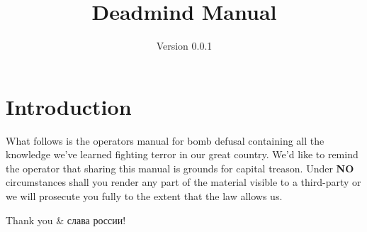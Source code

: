 \documentclass{article}
\title{Deadmind Manual}
\date{Version 0.0.1}
\begin{document}
\maketitle

\section* {Introduction}
What follows is the operators manual for bomb defusal containing all the knowledge we've learned fighting terror in our great country. We'd like to remind the operator that sharing this manual is grounds for capital treason. Under \textbf{NO} circumstances shall you render any part of the material visible to a third-party or we will prosecute you fully to the extent that the law allows us.

Thank you \& слава россии!
\end{document}
